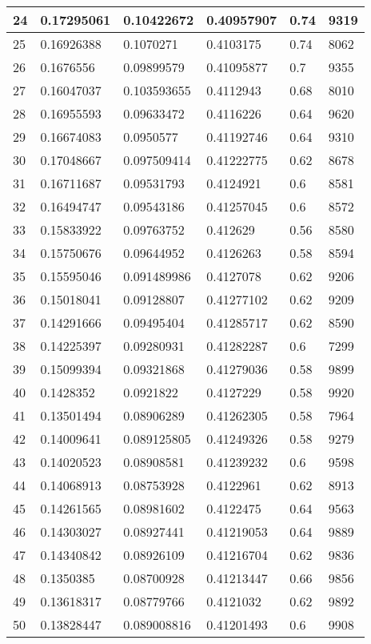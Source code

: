 \begin{longtable}{|l|l|l|l|l|l|}
24 & 0.17295061 & 0.10422672 & 0.40957907 & 0.74 & 9319 \\ \hline 
25 & 0.16926388 & 0.1070271 & 0.4103175 & 0.74 & 8062 \\ \hline 
26 & 0.1676556 & 0.09899579 & 0.41095877 & 0.7 & 9355 \\ \hline 
27 & 0.16047037 & 0.103593655 & 0.4112943 & 0.68 & 8010 \\ \hline 
28 & 0.16955593 & 0.09633472 & 0.4116226 & 0.64 & 9620 \\ \hline 
29 & 0.16674083 & 0.0950577 & 0.41192746 & 0.64 & 9310 \\ \hline 
30 & 0.17048667 & 0.097509414 & 0.41222775 & 0.62 & 8678 \\ \hline 
31 & 0.16711687 & 0.09531793 & 0.4124921 & 0.6 & 8581 \\ \hline 
32 & 0.16494747 & 0.09543186 & 0.41257045 & 0.6 & 8572 \\ \hline 
33 & 0.15833922 & 0.09763752 & 0.412629 & 0.56 & 8580 \\ \hline 
34 & 0.15750676 & 0.09644952 & 0.4126263 & 0.58 & 8594 \\ \hline 
35 & 0.15595046 & 0.091489986 & 0.4127078 & 0.62 & 9206 \\ \hline 
36 & 0.15018041 & 0.09128807 & 0.41277102 & 0.62 & 9209 \\ \hline 
37 & 0.14291666 & 0.09495404 & 0.41285717 & 0.62 & 8590 \\ \hline 
38 & 0.14225397 & 0.09280931 & 0.41282287 & 0.6 & 7299 \\ \hline 
39 & 0.15099394 & 0.09321868 & 0.41279036 & 0.58 & 9899 \\ \hline 
40 & 0.1428352 & 0.0921822 & 0.4127229 & 0.58 & 9920 \\ \hline 
41 & 0.13501494 & 0.08906289 & 0.41262305 & 0.58 & 7964 \\ \hline 
42 & 0.14009641 & 0.089125805 & 0.41249326 & 0.58 & 9279 \\ \hline 
43 & 0.14020523 & 0.08908581 & 0.41239232 & 0.6 & 9598 \\ \hline 
44 & 0.14068913 & 0.08753928 & 0.4122961 & 0.62 & 8913 \\ \hline 
45 & 0.14261565 & 0.08981602 & 0.4122475 & 0.64 & 9563 \\ \hline 
46 & 0.14303027 & 0.08927441 & 0.41219053 & 0.64 & 9889 \\ \hline 
47 & 0.14340842 & 0.08926109 & 0.41216704 & 0.62 & 9836 \\ \hline 
48 & 0.1350385 & 0.08700928 & 0.41213447 & 0.66 & 9856 \\ \hline 
49 & 0.13618317 & 0.08779766 & 0.4121032 & 0.62 & 9892 \\ \hline 
50 & 0.13828447 & 0.089008816 & 0.41201493 & 0.6 & 9908 \\ \hline 
\end{longtable}
